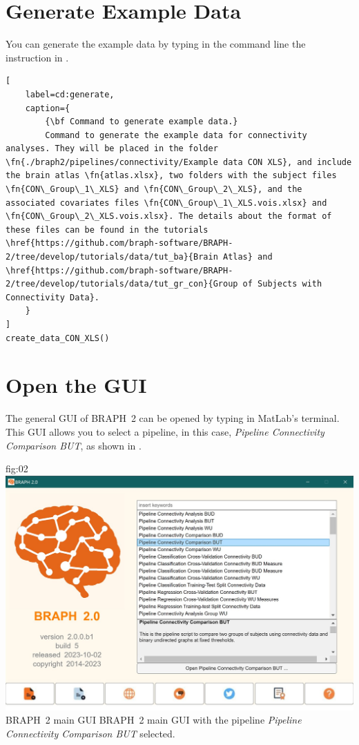 \documentclass[justified]{tufte-handout}
\begin{document}

\tableofcontents

\clearpage
\section{Generate Example Data}

You can generate the example data by typing in the command line the instruction in .

\begin{lstlisting}[
	label=cd:generate,
	caption={
		{\bf Command to generate example data.}
		Command to generate the example data for connectivity analyses. They will be placed in the folder \fn{./braph2/pipelines/connectivity/Example data CON XLS}, and include the brain atlas \fn{atlas.xlsx}, two folders with the subject files \fn{CON\_Group\_1\_XLS} and \fn{CON\_Group\_2\_XLS}, and the associated covariates files \fn{CON\_Group\_1\_XLS.vois.xlsx} and \fn{CON\_Group\_2\_XLS.vois.xlsx}. The details about the format of these files can be found in the tutorials \href{https://github.com/braph-software/BRAPH-2/tree/develop/tutorials/data/tut_ba}{Brain Atlas} and \href{https://github.com/braph-software/BRAPH-2/tree/develop/tutorials/data/tut_gr_con}{Group of Subjects with Connectivity Data}.
	}
]
create_data_CON_XLS()
\end{lstlisting}

\section{Open the GUI}

The general GUI of BRAPH~2 can be opened by typing  in MatLab's terminal. This GUI allows you to select a pipeline, in this case, \emph{Pipeline Connectivity Comparison BUT}, as shown in .

{fig:02}
{
	\includegraphics{fig02.jpg}
}
{BRAPH~2 main GUI}
{
	BRAPH~2 main GUI with the pipeline \emph{Pipeline Connectivity Comparison BUT} selected.
}
\end{document}
